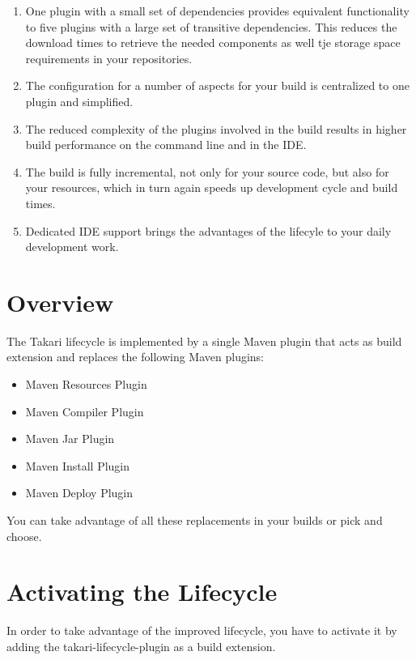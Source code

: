 \documentclass[a4paper]{book}
\begin{document}
\begin{enumerate}
\def\labelenumi{\arabic{enumi}.}
\item
  One plugin with a small set of dependencies provides equivalent functionality to five plugins with a large set of transitive dependencies. This reduces the download times to retrieve the needed components as well tje storage space requirements in your repositories.
\item
  The configuration for a number of aspects for your build is centralized to one plugin and simplified.
\item
  The reduced complexity of the plugins involved in the build results in higher build performance on the command line and in the IDE.
\item
  The build is fully incremental, not only for your source code, but also for your resources, which in turn again speeds up development cycle and build times.
\item
  Dedicated IDE support brings the advantages of the lifecyle to your daily development work.
\end{enumerate}

\section{Overview}\label{overview}

The Takari lifecycle is implemented by a single Maven plugin that acts as build extension and replaces the following Maven plugins:

\begin{itemize}
\itemsep1pt\parskip0pt
\item
  Maven Resources Plugin
\item
  Maven Compiler Plugin
\item
  Maven Jar Plugin
\item
  Maven Install Plugin
\item
  Maven Deploy Plugin
\end{itemize}

You can take advantage of all these replacements in your builds or pick and choose.

\section{Activating the Lifecycle}\label{activating-the-lifecycle}

In order to take advantage of the improved lifecycle, you have to activate it by adding the takari-lifecycle-plugin as a build extension.
\end{document}
